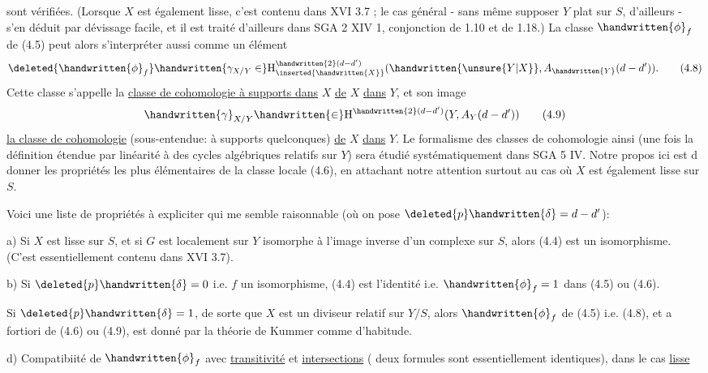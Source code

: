 sont vérifiées. (Lorsque $X$ est également lisse, c'est contenu dans XVI 3.7 ; le cas général - sans même supposer $Y$ plat sur $S$, d'ailleurs - s'en déduit par  dévissage facile, et il est traité d'ailleurs dans SGA 2 XIV 1, conjonction de 1.10 et de 1.18.) La classe $\handwritten{\phi}_f$ de (4.5) peut alors s'interpréter aussi comme un élément 
\[
\deleted{\handwritten{\phi}_f}\handwritten{\gamma_{X/Y}\in}\mathrm{H}^{\handwritten{2}(d-d')}_{\inserted{\handwritten{X}}}(\handwritten{\unsure{Y|X}},A_{\handwritten{Y}}(d-d')).
\tag*{(4.8)}
\]
Cette classe s'appelle la \uline{classe de cohomologie à supports dans} $X$ \uline{de} $X$ \uline{dans} $Y$, et son image
\[
\handwritten{\gamma}_{X/Y}\handwritten{\in}\mathrm{H}^{\handwritten{2}(d-d')}(Y,A_Y(d-d'))
\tag*{(4.9)}
\]
\uline{la classe de cohomologie} (sous-entendue: à supports quelconques) \uline{de} $X$ \uline{dans} $Y$. Le formalisme des classes de cohomologie ainsi   (une fois la définition étendue par linéarité à des cycles algébriques relatifs sur $Y$) sera étudié systématiquement dans SGA 5 IV. Notre propos ici est d donner  les propriétés les plus élémentaires de la classe locale (4.6), en attachant notre attention surtout au cas où $X$ est également lisse sur $S$.

Voici une liste de propriétés à expliciter qui me semble raisonnable\deleted{\unsure{;|:}} (où on pose $\deleted{p}\handwritten{\delta}=d-d'$)\deleted{;}:

 a) Si $X$ est lisse sur $S$, et si $G$ est localement sur $Y$ isomorphe à l'image inverse d'un complexe sur $S$, alors (4.4) est un isomorphisme. (C'est essentiellement contenu dans XVI 3.7).

 b) Si $\deleted{p}\handwritten{\delta}=0$ i.e. $f$ un isomorphisme, (4.4) est l'identité i.e. $\handwritten{\phi}_f=1$ dans (4.5) ou (4.6).

 Si $\deleted{p}\handwritten{\delta}=1$, de sorte que $X$ est un diviseur relatif sur $Y/S$, alors $\handwritten{\phi}_f$ de (4.5) i.e. (4.8), et a fortiori de (4.6) ou (4.9), est donné par la théorie de Kummer comme d'habitude.

 d) Compatibiité de $\handwritten{\phi}_f$ avec \uline{transitivité} et \uline{intersections} ( deux formules sont essentiellement identiques), dans le cas \uline{lisse}\handwritten{\unsure{,|;}}
